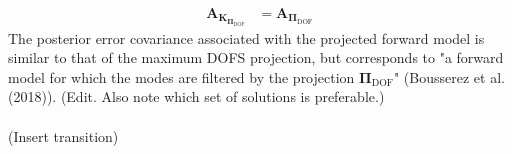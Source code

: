 \documentclass{article}
\newcommand{\K}{\mathbf{K}}
\newcommand{\A}{\mathbf{A}}
\newcommand{\dof}[1]{#1_\mathrm{DOF}}
\newcommand{\pidof}{\dof{\mathbf{\Pi}}}
\newcommand{\Adof}{\mathbf{A}_{\pidof}}
\begin{document}
{\begin{align}
	\A_{\K_{\pidof}} &= \Adof
\end{align}
The posterior error covariance associated with the projected forward model is similar to that of the maximum DOFS projection, but corresponds to "a forward model for which the modes are filtered by the projection $\pidof$" (Bousserez et al. (2018)). (Edit. Also note which set of solutions is preferable.)\\
\\
(Insert transition)

}
\end{document}
